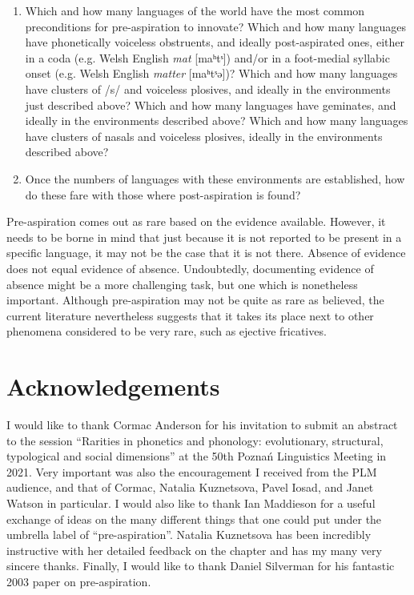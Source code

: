 \documentclass[output=paper]{langscibook}
\begin{document}
\begin{enumerate}
\item Which and how many languages of the world have the most common preconditions for pre\hyp aspiration to innovate? Which and how many languages have phonetically voiceless obstruents, and ideally post-aspirated ones, either in a coda (e.g. Welsh English \textit{mat} [maʰtˢ]) and/or in a foot-medial syllabic onset (e.g. Welsh English \textit{matter} [maʰtˢə])? Which and how many languages have clusters of /s/ and voiceless plosives, and ideally in the environments just described above? Which and how many languages have geminates, and ideally in the environments described above? Which and how many languages have clusters of nasals and voiceless plosives, ideally in the environments described above?
\item Once the numbers of languages with these environments are established, how do these fare with those where post-aspiration is found?
\end{enumerate}

Pre-aspiration comes out as rare based on the evidence available. However, it needs to be borne in mind that just because it is not reported to be present in a specific language, it may not be the case that it is not there. Absence of evidence does not equal evidence of absence. Undoubtedly, documenting evidence of absence might be a more challenging task, but one which is nonetheless important. Although pre\hyp aspiration may not be quite as rare as believed, the current literature nevertheless suggests that it takes its place next to other phenomena considered to be very rare, such as ejective fricatives.

\section*{Acknowledgements}

I would like to thank Cormac Anderson for his invitation to submit an abstract to the session “Rarities in phonetics and phonology: evolutionary, structural, typological and social dimensions” at the 50th Poznań Linguistics Meeting in 2021. Very important was also the encouragement I received from the PLM audience, and that of Cormac, Natalia Kuznetsova, Pavel Iosad, and Janet Watson in particular. I would also like to thank Ian Maddieson for a useful exchange of ideas on the many different things that one could put under the umbrella label of “pre-aspiration”. Natalia Kuznetsova has been incredibly instructive with her detailed feedback on the chapter and has my many very sincere thanks. Finally, I would like to thank Daniel Silverman for his fantastic 2003 paper on pre-aspiration.
\end{document}
